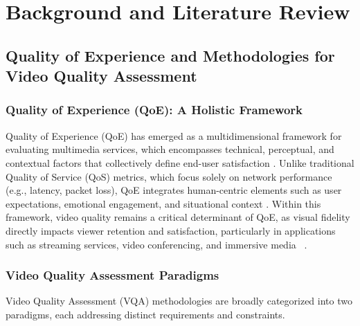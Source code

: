 \chapter{Background and Literature Review} \label{chap:ch2}

\section{Quality of Experience and Methodologies for Video Quality Assessment}  

\subsection{Quality of Experience (QoE): A Holistic Framework}  
Quality of Experience (QoE) has emerged as a multidimensional framework for evaluating multimedia services, which encompasses technical, perceptual, and contextual factors that collectively define end-user satisfaction \cite{itu2012recommendation}. Unlike traditional Quality of Service (QoS) metrics, which focus solely on network performance (e.g., latency, packet loss), QoE integrates human-centric elements such as user expectations, emotional engagement, and situational context \cite{brunnstrom2013qualinet}. Within this framework, video quality remains a critical determinant of QoE, as visual fidelity directly impacts viewer retention and satisfaction, particularly in applications such as streaming services, video conferencing, and immersive media ~\cite{wang2004ssim}.

\subsection{Video Quality Assessment Paradigms}  
Video Quality Assessment (VQA) methodologies are broadly categorized into two paradigms, each addressing distinct requirements and constraints.  


